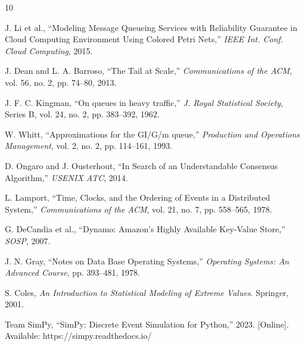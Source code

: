 \documentclass[conference,twocolumn]{IEEEtran}
\begin{document}

\begin{thebibliography}{10}

J. Li et al., ``Modeling Message Queueing Services with Reliability Guarantee in Cloud Computing Environment Using Colored Petri Nets,'' \textit{IEEE Int. Conf. Cloud Computing}, 2015.

J. Dean and L. A. Barroso, ``The Tail at Scale,'' \textit{Communications of the ACM}, vol. 56, no. 2, pp. 74--80, 2013.

J. F. C. Kingman, ``On queues in heavy traffic,'' \textit{J. Royal Statistical Society}, Series B, vol. 24, no. 2, pp. 383--392, 1962.

W. Whitt, ``Approximations for the GI/G/m queue,'' \textit{Production and Operations Management}, vol. 2, no. 2, pp. 114--161, 1993.

D. Ongaro and J. Ousterhout, ``In Search of an Understandable Consensus Algorithm,'' \textit{USENIX ATC}, 2014.

L. Lamport, ``Time, Clocks, and the Ordering of Events in a Distributed System,'' \textit{Communications of the ACM}, vol. 21, no. 7, pp. 558--565, 1978.

G. DeCandia et al., ``Dynamo: Amazon's Highly Available Key-Value Store,'' \textit{SOSP}, 2007.

J. N. Gray, ``Notes on Data Base Operating Systems,'' \textit{Operating Systems: An Advanced Course}, pp. 393--481, 1978.

S. Coles, \textit{An Introduction to Statistical Modeling of Extreme Values}. Springer, 2001.

Team SimPy, ``SimPy: Discrete Event Simulation for Python,'' 2023. [Online]. Available: https://simpy.readthedocs.io/

\end{thebibliography}
\end{document}
